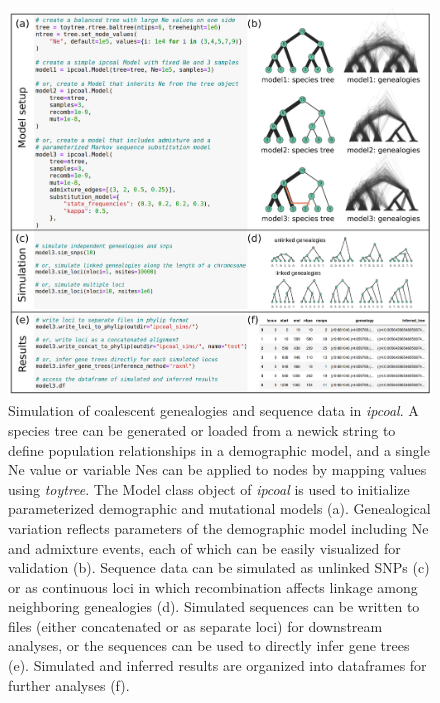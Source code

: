 \documentclass[11pt]{article}
\begin{document}
\begin{figure}
  \centering
  \includegraphics[width=15cm]{composite.pdf}
  \caption{Simulation of coalescent genealogies and sequence data in \emph{ipcoal}. A species tree can be generated or loaded from a newick string to define population relationships in a demographic model, and a single Ne value or variable Nes can be applied to nodes by mapping values using \emph{toytree}. The Model class object of \emph{ipcoal} is used to initialize parameterized demographic and mutational models (a). Genealogical variation reflects parameters of the demographic model including Ne and admixture events, each of which can be easily visualized for validation (b). Sequence data can be simulated as unlinked SNPs (c) or as continuous loci in which recombination affects linkage among neighboring genealogies (d). Simulated sequences can be written to files (either concatenated or as separate loci) for downstream analyses, or the sequences can be used to directly infer gene trees (e). Simulated and inferred results are organized into dataframes for further analyses (f).
  }
  \label{fig:fig1}
\end{figure}
\end{document}
